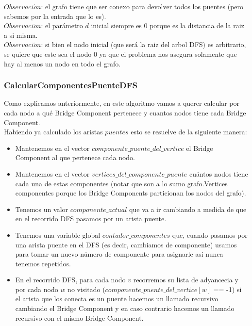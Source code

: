 $Observaci\acute{o}n$: el grafo tiene que ser conexo para devolver todos los puentes (pero sabemos por la entrada que lo es). \\

$Observaci\acute{o}n$: el parámetro $d$ inicial siempre es 0 porque es la distancia de la raiz a si misma. \\

$Observaci\acute{o}n$: si bien el nodo inicial (que será la raiz del arbol DFS) es arbitrario, se quiere que
este sea el nodo 0 ya que el problema nos asegura solamente que hay al menos un nodo en todo el grafo. \\

\subsubsection*{CalcularComponentesPuenteDFS}

Como explicamos anteriormente, en este algoritmo vamos a querer calcular por cada nodo a qué Bridge Component pertenece
y cuantos nodos tiene cada Bridge Component. \\

Habiendo ya calculado los aristas $puentes$ esto se resuelve de la siguiente manera:
\begin{itemize}
	\item Mantenemos en el vector $componente\_puente\_del\_vertice$ el Bridge Component al que pertenece cada nodo.
	\item Mantenemos en el vector $vertices\_del\_componente\_puente$ cuántos nodos tiene cada una de estas componentes
	(notar que son a lo sumo grafo.Vertices componentes porque los Bridge Components particionan los nodos del grafo).
	\item Tenemos un valor $componente\_actual$ que va a ir cambiando a medida de que en el recorrido DFS pasamos por un arista puente.
	\item Tenemos una variable global $contador\_componentes$ que, cuando pasamos por una arista puente en el DFS (es decir, cambiamos
	de componente) usamos para tomar un nuevo n\'umero de componente para asignarle asi nunca tenemos repetidos.
	\item En el recorrido DFS, para cada nodo $v$ recorremos su lista de adyancecia y por cada nodo $w$ no visitado
	($componente\_puente\_del\_vertice[w]$ == -1) si el arista que los conecta es un puente hacemos un llamado recursivo cambiando el
	Bridge Component y en caso contrario hacemos un llamado recursivo con el mismo Bridge Component.
\end{itemize}

